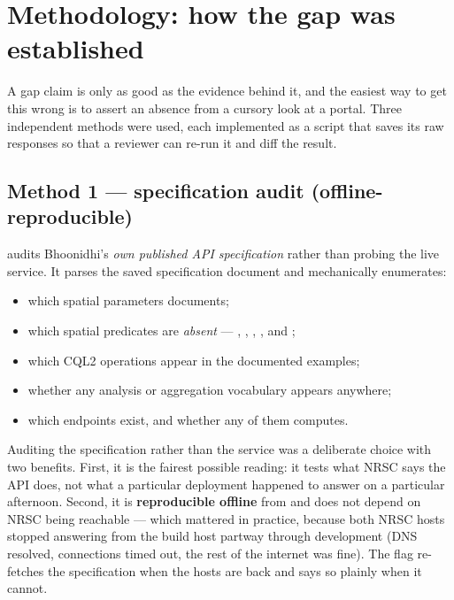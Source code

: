 \section{Methodology: how the gap was established}
\label{sec:methodology}

A gap claim is only as good as the evidence behind it, and the easiest way to
get this wrong is to assert an absence from a cursory look at a portal. Three
independent methods were used, each implemented as a script that saves its
raw responses so that a reviewer can re-run it and diff the result.

\subsection{Method 1 --- specification audit (offline-reproducible)}

 audits Bhoonidhi's \emph{own published API
specification} rather than probing the live service. It parses the saved
specification document and mechanically enumerates:

\begin{itemize}
  \item which spatial parameters  documents;
  \item which spatial predicates are \emph{absent} --- ,
        , , ,
         and ;
  \item which CQL2 operations appear in the documented examples;
  \item whether any analysis or aggregation vocabulary appears anywhere;
  \item which endpoints exist, and whether any of them computes.
\end{itemize}

Auditing the specification rather than the service was a deliberate choice
with two benefits. First, it is the fairest possible reading: it tests what
NRSC says the API does, not what a particular deployment happened to answer
on a particular afternoon. Second, it is \textbf{reproducible offline} from
 and does not depend on NRSC being
reachable --- which mattered in practice, because both NRSC hosts stopped
answering from the build host partway through development (DNS resolved,
connections timed out, the rest of the internet was fine). The
 flag re-fetches the specification when the hosts are back and
says so plainly when it cannot.

